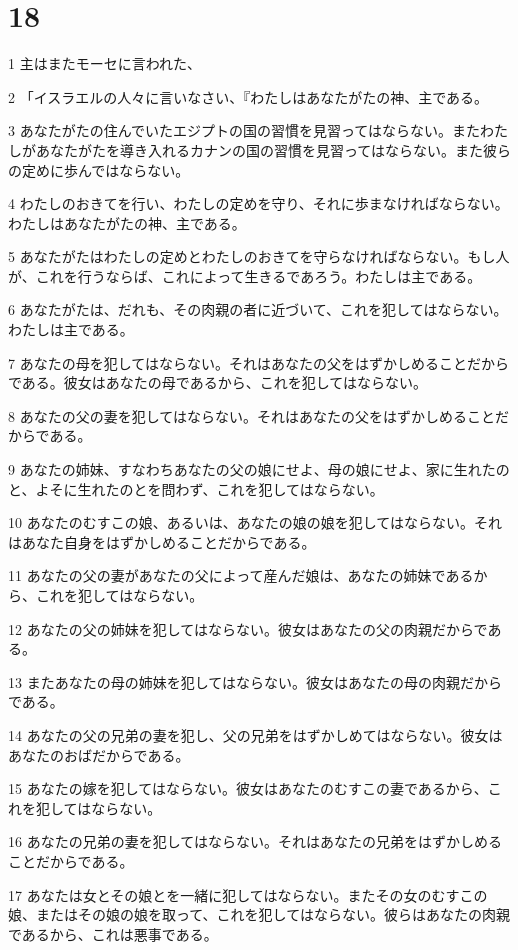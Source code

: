 \chapter{18}

\par 1 主はまたモーセに言われた、
\par 2 「イスラエルの人々に言いなさい、『わたしはあなたがたの神、主である。
\par 3 あなたがたの住んでいたエジプトの国の習慣を見習ってはならない。またわたしがあなたがたを導き入れるカナンの国の習慣を見習ってはならない。また彼らの定めに歩んではならない。
\par 4 わたしのおきてを行い、わたしの定めを守り、それに歩まなければならない。わたしはあなたがたの神、主である。
\par 5 あなたがたはわたしの定めとわたしのおきてを守らなければならない。もし人が、これを行うならば、これによって生きるであろう。わたしは主である。
\par 6 あなたがたは、だれも、その肉親の者に近づいて、これを犯してはならない。わたしは主である。
\par 7 あなたの母を犯してはならない。それはあなたの父をはずかしめることだからである。彼女はあなたの母であるから、これを犯してはならない。
\par 8 あなたの父の妻を犯してはならない。それはあなたの父をはずかしめることだからである。
\par 9 あなたの姉妹、すなわちあなたの父の娘にせよ、母の娘にせよ、家に生れたのと、よそに生れたのとを問わず、これを犯してはならない。
\par 10 あなたのむすこの娘、あるいは、あなたの娘の娘を犯してはならない。それはあなた自身をはずかしめることだからである。
\par 11 あなたの父の妻があなたの父によって産んだ娘は、あなたの姉妹であるから、これを犯してはならない。
\par 12 あなたの父の姉妹を犯してはならない。彼女はあなたの父の肉親だからである。
\par 13 またあなたの母の姉妹を犯してはならない。彼女はあなたの母の肉親だからである。
\par 14 あなたの父の兄弟の妻を犯し、父の兄弟をはずかしめてはならない。彼女はあなたのおばだからである。
\par 15 あなたの嫁を犯してはならない。彼女はあなたのむすこの妻であるから、これを犯してはならない。
\par 16 あなたの兄弟の妻を犯してはならない。それはあなたの兄弟をはずかしめることだからである。
\par 17 あなたは女とその娘とを一緒に犯してはならない。またその女のむすこの娘、またはその娘の娘を取って、これを犯してはならない。彼らはあなたの肉親であるから、これは悪事である。
